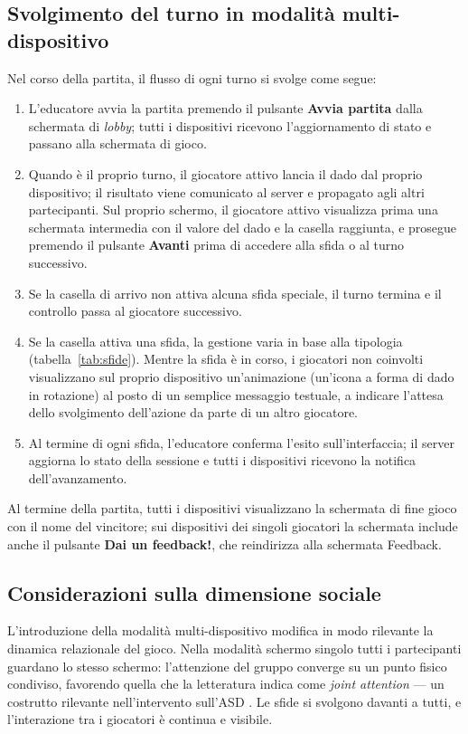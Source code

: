 \documentclass[12pt]{report}
\begin{document}
\subsection{Svolgimento del turno in modalità multi-dispositivo}

Nel corso della partita, il flusso di ogni turno si svolge come segue:

\begin{enumerate}
    \item L'educatore avvia la partita premendo il pulsante \textbf{Avvia partita} dalla schermata di \textit{lobby}; tutti i dispositivi ricevono l'aggiornamento di stato e passano alla schermata di gioco.
    \item Quando è il proprio turno, il giocatore attivo lancia il dado dal proprio dispositivo; il risultato viene comunicato al server e propagato agli altri partecipanti. Sul proprio schermo, il giocatore attivo visualizza prima una schermata intermedia con il valore del dado e la casella raggiunta, e prosegue premendo il pulsante \textbf{Avanti} prima di accedere alla sfida o al turno successivo.
    \item Se la casella di arrivo non attiva alcuna sfida speciale, il turno termina e il controllo passa al giocatore successivo.
    \item Se la casella attiva una sfida, la gestione varia in base alla tipologia (tabella~\ref{tab:sfide}). Mentre la sfida è in corso, i giocatori non coinvolti visualizzano sul proprio dispositivo un'animazione (un'icona a forma di dado in rotazione) al posto di un semplice messaggio testuale, a indicare l'attesa dello svolgimento dell'azione da parte di un altro giocatore.
    \item Al termine di ogni sfida, l'educatore conferma l'esito sull'interfaccia; il server aggiorna lo stato della sessione e tutti i dispositivi ricevono la notifica dell'avanzamento.
\end{enumerate}

Al termine della partita, tutti i dispositivi visualizzano la schermata di fine gioco con il nome del vincitore; sui dispositivi dei singoli giocatori la schermata include anche il pulsante \textbf{Dai un feedback!}, che reindirizza alla schermata Feedback.

\subsection{Considerazioni sulla dimensione sociale}

L'introduzione della modalità multi-dispositivo modifica in modo rilevante la dinamica relazionale del gioco. Nella modalità schermo singolo tutti i partecipanti guardano lo stesso schermo: l'attenzione del gruppo converge su un punto fisico condiviso, favorendo quella che la letteratura indica come \textit{joint attention} --- un costrutto rilevante nell'intervento sull'ASD \cite{mesibov2005}. Le sfide si svolgono davanti a tutti, e l'interazione tra i giocatori è continua e visibile.
\end{document}
